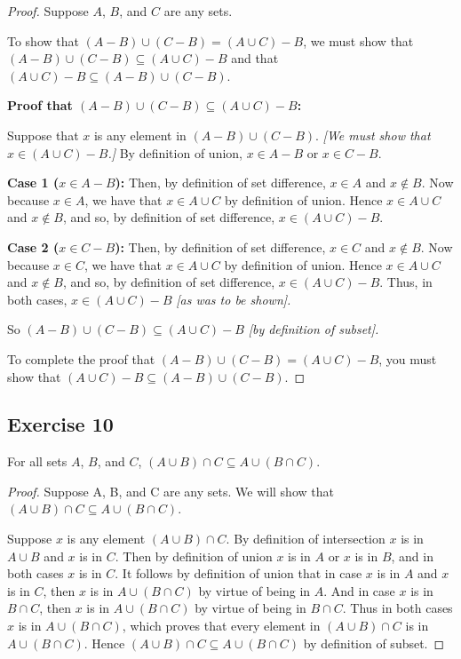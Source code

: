 \documentclass[14pt]{extarticle}
\begin{document}
\begin{proof}
Suppose $A$, $B$, and $C$ are any sets. 

To show that \((A - B) \cup (C - B) = (A \cup C ) - B\), we must show that \((A - B) \cup (C - B) \subseteq (A \cup C) - B\) 
and that \((A \cup C) - B \subseteq (A - B) \cup (C - B)\).

{\bf Proof that \((A - B) \cup (C - B) \subseteq (A \cup C) - B\):}

Suppose that $x$ is any element in \((A - B) \cup (C - B)\). {\it [We must show that \(x \in (A \cup C ) - B\).]} 
By definition of union, \(x \in A - B\) or \(x \in C - B\).

{\bf Case 1 (\(x \in A - B\)):} Then, by definition of set difference, \(x \in A\) and \(x \notin B\). Now because 
\(x \in A\), we have that \(x \in A \cup C\) by definition of union. Hence \(x \in A \cup C\) and \(x \notin B\), and 
so, by definition of set difference, \(x \in (A \cup C ) - B\).

{\bf Case 2 (\(x \in C - B\)):} Then, by definition of set difference, \(x \in C\) and \(x \notin B\). Now because 
\(x \in C\), we have that \(x \in A \cup C\) by definition of union. Hence \(x \in A \cup C\) and \(x \notin B\), and 
so, by definition of set difference, \(x \in (A \cup C) - B\). Thus, in both cases, \(x \in (A \cup C ) - B\) 
{\it [as was to be shown].} 

So \((A - B) \cup (C - B) \subseteq (A \cup C ) - B\) {\it [by definition of subset].}

To complete the proof that \((A - B ) \cup (C - B) = (A \cup C) - B\), you must show that 
\((A \cup C) - B \subseteq (A - B) \cup (C - B)\).
\end{proof}

\subsection{Exercise 10}
For all sets $A$, $B$, and $C$, \((A \cup B) \cap C \subseteq A \cup (B \cap C)\).

\begin{proof}
Suppose A, B, and C are any sets. We will show that \((A \cup B) \cap C \subseteq A \cup (B \cap C)\).

Suppose $x$ is any element \((A \cup B) \cap C\). By definition of intersection $x$ is in \(A \cup B\) and $x$ 
is in $C$. Then by definition of union $x$ is in $A$ or $x$ is in $B$, and in both cases $x$ is in $C$. It follows by 
definition of union that in case $x$ is in $A$ and $x$ is in $C$, then $x$ is in \(A \cup (B \cap C)\) by virtue of 
being in $A$. And in case $x$ is in \(B \cap C\), then $x$ is in \(A \cup (B \cap C)\) by virtue of being in 
\(B \cap C\). Thus in both cases $x$ is in \(A \cup (B \cap C )\), which proves that every element in \((A \cup B) \cap C\)
is in \(A \cup (B \cap C)\). Hence \((A \cup B) \cap C \subseteq A \cup (B \cap C)\) by definition of subset.
\end{proof}
\end{document}
